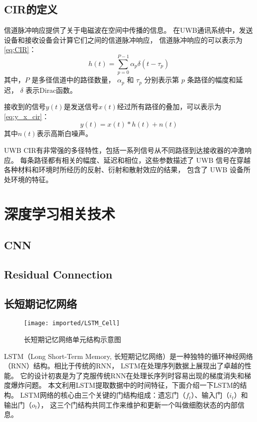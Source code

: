 \subsection{CIR的定义}
信道脉冲响应提供了关于电磁波在空间中传播的信息。
在UWB通讯系统中，发送设备和接收设备会计算它们之间的信道脉冲响应，
信道脉冲响应的可以表示为\ref{eq:CIR}：
\begin{equation}\label{eq:CIR}
    h(t)=\sum_{p=0}^{P-1} \alpha_p \delta\left(t-\tau_p\right)
\end{equation}
其中，\( P \) 是多径信道中的路径数量，
\( \alpha_p \) 和 \( \tau_p \) 分别表示第 \( p \) 条路径的幅度和延迟，
\(\delta\) 表示Dirac函数\cite{UWB_CIR_INTRO}。

接收到的信号\(y(t)\)是发送信号\(x(t)\)经过所有路径的叠加，可以表示为\ref{eq:y_x_cir}：
\begin{equation}\label{eq:y_x_cir}
    y(t)=x(t) * h(t)+n(t)
\end{equation}
其中\( n(t) \)表示高斯白噪声\cite{tse2005fundamentals}。 

UWB CIR有非常强的多径特性，包括一系列信号从不同路径到达接收器的冲激响应。
每条路径都有相关的幅度、延迟和相位，这些参数描述了
UWB 信号在穿越各种材料和环境时所经历的反射、衍射和散射效应的结果，
包含了 UWB 设备所处环境的特征。


\section{深度学习相关技术}
\subsection{CNN}

\subsection{Residual Connection}

\subsection{长短期记忆网络}
\begin{figure}[htbp]
    \centering
    \texttt{[image: imported/LSTM\_Cell]}
    \caption{\label{fig:LSTM_Cell}长短期记忆网络单元结构示意图}
\end{figure}

LSTM（Long Short-Term Memory, 长短期记忆网络）是一种独特的循环神经网络（RNN）结构。相比于传统的RNN，
LSTM在处理序列数据上展现出了卓越的性能。
它的设计初衷是为了克服传统RNN在处理长序列时容易出现的梯度消失和梯度爆炸问题。
本文利用LSTM提取数据中的时间特征，下面介绍一下LSTM的结构。
LSTM网络的核心由三个关键的门结构组成：遗忘门（\(f_t\)）、输入门（\(i_t\)）和输出门（\(o_t\)），
这三个门结构共同工作来维护和更新一个叫做细胞状态的内部信息。

